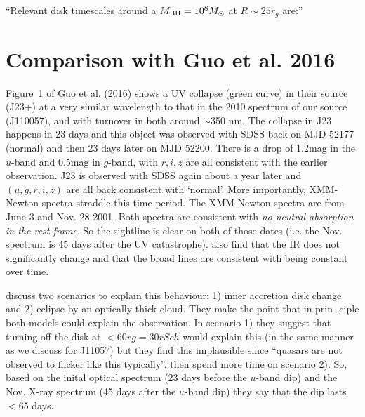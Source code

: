 \documentclass[11pt,a4paper]{article}
\begin{document}
``Relevant disk timescales around a $M_{\rm BH} = 10^{8} M_{\odot}$ at $R\sim 25r_{g}$ are:''

\section{Comparison with Guo et al. 2016}
Figure~1 of Guo et al. (2016) shows a UV collapse (green curve) in
their source (J23+) at a very similar wavelength to that in the 2010
spectrum of our source (J110057), and with turnover in both around
$\sim$350 nm.  The collapse in J23 happens in 23 days \citep[Figure 2
of ][]{Guo2016} and this object was observed with SDSS back on MJD
52177 (normal) and then 23 days later on MJD 52200. There is a drop of
1.2mag in the $u$-band and 0.5mag in $g$-band, with $r,i,z$ are all
consistent with the earlier observation. J23 is observed with SDSS
again about a year later and $(u,g,r,i,z)$ are all back consistent
with `normal'. More importantly, XMM-Newton spectra straddle this time
period. The XMM-Newton spectra are from June 3 and Nov. 28 2001. Both
spectra are consistent with {\it no neutral absorption in the
rest-frame}. So the sightline is clear on both of those dates
(i.e. the Nov. spectrum is 45 days after the UV
catastrophe). \citet{Guo2016} also find that the IR does not
significantly change and that the broad lines are consistent with
being constant over time.


\citet{Guo2016} discuss two scenarios to explain this behaviour: 1)
inner accretion disk change and 2) eclipse by an optically thick
cloud. They make the point that in prin- ciple both models could
explain the observation. In scenario 1) they suggest that turning off
the disk at $< 60rg = 30 rSch$ would explain this (in the same manner
as we discuss for J11057) but they find this implausible since
``quasars are not observed to flicker like this typically''.
\citet{Guo2016} then spend more time on scenario 2). So, based on the
inital optical spectrum (23 days before the $u$-band dip) and the
Nov. X-ray spectrum (45 days after the $u$-band dip) they say that the
dip lasts $< 65$ days. 





\end{document}
